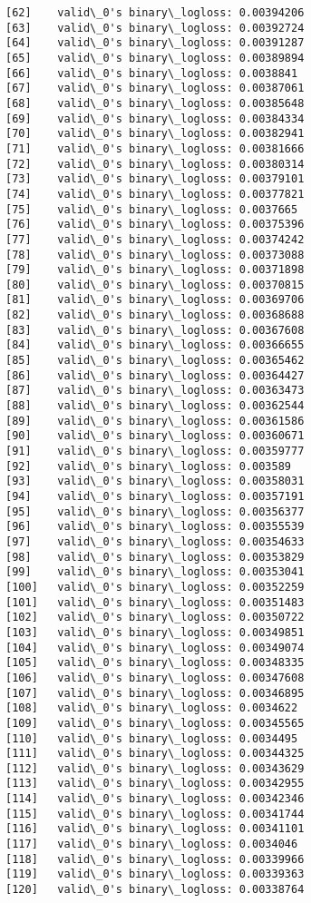 \documentclass[11pt]{article}
\begin{document}
\begin{Verbatim}[commandchars=\\\{\}]
[62]	valid\_0's binary\_logloss: 0.00394206
[63]	valid\_0's binary\_logloss: 0.00392724
[64]	valid\_0's binary\_logloss: 0.00391287
[65]	valid\_0's binary\_logloss: 0.00389894
[66]	valid\_0's binary\_logloss: 0.0038841
[67]	valid\_0's binary\_logloss: 0.00387061
[68]	valid\_0's binary\_logloss: 0.00385648
[69]	valid\_0's binary\_logloss: 0.00384334
[70]	valid\_0's binary\_logloss: 0.00382941
[71]	valid\_0's binary\_logloss: 0.00381666
[72]	valid\_0's binary\_logloss: 0.00380314
[73]	valid\_0's binary\_logloss: 0.00379101
[74]	valid\_0's binary\_logloss: 0.00377821
[75]	valid\_0's binary\_logloss: 0.0037665
[76]	valid\_0's binary\_logloss: 0.00375396
[77]	valid\_0's binary\_logloss: 0.00374242
[78]	valid\_0's binary\_logloss: 0.00373088
[79]	valid\_0's binary\_logloss: 0.00371898
[80]	valid\_0's binary\_logloss: 0.00370815
[81]	valid\_0's binary\_logloss: 0.00369706
[82]	valid\_0's binary\_logloss: 0.00368688
[83]	valid\_0's binary\_logloss: 0.00367608
[84]	valid\_0's binary\_logloss: 0.00366655
[85]	valid\_0's binary\_logloss: 0.00365462
[86]	valid\_0's binary\_logloss: 0.00364427
[87]	valid\_0's binary\_logloss: 0.00363473
[88]	valid\_0's binary\_logloss: 0.00362544
[89]	valid\_0's binary\_logloss: 0.00361586
[90]	valid\_0's binary\_logloss: 0.00360671
[91]	valid\_0's binary\_logloss: 0.00359777
[92]	valid\_0's binary\_logloss: 0.003589
[93]	valid\_0's binary\_logloss: 0.00358031
[94]	valid\_0's binary\_logloss: 0.00357191
[95]	valid\_0's binary\_logloss: 0.00356377
[96]	valid\_0's binary\_logloss: 0.00355539
[97]	valid\_0's binary\_logloss: 0.00354633
[98]	valid\_0's binary\_logloss: 0.00353829
[99]	valid\_0's binary\_logloss: 0.00353041
[100]	valid\_0's binary\_logloss: 0.00352259
[101]	valid\_0's binary\_logloss: 0.00351483
[102]	valid\_0's binary\_logloss: 0.00350722
[103]	valid\_0's binary\_logloss: 0.00349851
[104]	valid\_0's binary\_logloss: 0.00349074
[105]	valid\_0's binary\_logloss: 0.00348335
[106]	valid\_0's binary\_logloss: 0.00347608
[107]	valid\_0's binary\_logloss: 0.00346895
[108]	valid\_0's binary\_logloss: 0.0034622
[109]	valid\_0's binary\_logloss: 0.00345565
[110]	valid\_0's binary\_logloss: 0.0034495
[111]	valid\_0's binary\_logloss: 0.00344325
[112]	valid\_0's binary\_logloss: 0.00343629
[113]	valid\_0's binary\_logloss: 0.00342955
[114]	valid\_0's binary\_logloss: 0.00342346
[115]	valid\_0's binary\_logloss: 0.00341744
[116]	valid\_0's binary\_logloss: 0.00341101
[117]	valid\_0's binary\_logloss: 0.0034046
[118]	valid\_0's binary\_logloss: 0.00339966
[119]	valid\_0's binary\_logloss: 0.00339363
[120]	valid\_0's binary\_logloss: 0.00338764

\end{Verbatim}
\end{document}
